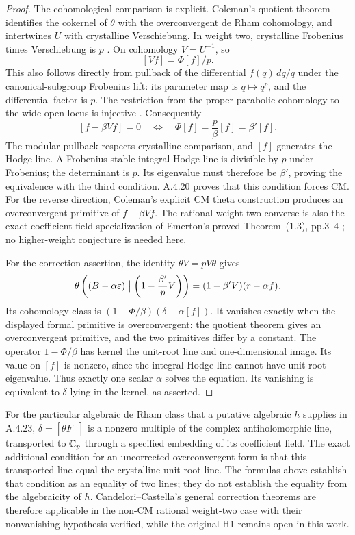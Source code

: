 \begin{proof}
The cohomological comparison is explicit. Coleman's quotient theorem identifies the cokernel of $\theta$ with the overconvergent de Rham cohomology, and intertwines $U$ with crystalline Verschiebung. In weight two, crystalline Frobenius times Verschiebung is $p$ \cite[Theorems 5.1 and 5.4, pp.223 and 225]{EllColeman1996}. On cohomology $V=U^{-1}$, so
\[
 [Vf]=\Phi[f]/p.
\]
This also follows directly from pullback of the differential $f(q)\,dq/q$ under the canonical-subgroup Frobenius lift: its parameter map is $q\mapsto q^p$, and the differential factor is $p$. The restriction from the proper parabolic cohomology to the wide-open locus is injective \cite[equation (6), p.6]{EllCandeloriCastella2017}. Consequently
\[
 [f-\beta Vf]=0
 \quad\Longleftrightarrow\quad
 \Phi[f]=\frac p\beta[f]=\beta'[f].
\]
The modular pullback respects crystalline comparison, and $[f]$ generates the Hodge line. A Frobenius-stable integral Hodge line is divisible by $p$ under Frobenius; the determinant is $p$. Its eigenvalue must therefore be $\beta'$, proving the equivalence with the third condition. A.4.20 proves that this condition forces CM. For the reverse direction, Coleman's explicit CM theta construction \cite[Proposition 7.1, p.231]{EllColeman1996} produces an overconvergent primitive of $f-\beta Vf$. The rational weight-two converse is also the exact coefficient-field specialization of Emerton's proved Theorem~(1.3), pp.3--4 \cite{EllEmertonCM}; no higher-weight conjecture is needed here.

For the correction assertion, the identity $\theta V=pV\theta$ gives
\[
 \theta\left((B-\alpha\varepsilon)\bigm|\left(1-\frac{\beta'}pV\right)\right)
 =(1-\beta' V)(r-\alpha f).
\]
Its cohomology class is
$(1-\Phi/\beta)(\delta-\alpha[f])$. It vanishes exactly when the displayed formal primitive is overconvergent: the quotient theorem gives an overconvergent primitive, and the two primitives differ by a constant. The operator $1-\Phi/\beta$ has kernel the unit-root line and one-dimensional image. Its value on $[f]$ is nonzero, since the integral Hodge line cannot have unit-root eigenvalue. Thus exactly one scalar $\alpha$ solves the equation. Its vanishing is equivalent to $\delta$ lying in the kernel, as asserted.
\end{proof}

For the particular algebraic de Rham class that a putative algebraic $h$ supplies in A.4.23, $\delta=[\theta F^+]$ is a nonzero multiple of the complex antiholomorphic line, transported to $\mathbb C_p$ through a specified embedding of its coefficient field. The exact additional condition for an uncorrected overconvergent form is that this transported line equal the crystalline unit-root line. The formulas above establish that condition as an equality of two lines; they do not establish the equality from the algebraicity of $h$. Candelori--Castella's general correction theorems \cite[Theorems 5.3 and 5.5, pp.11--12]{EllCandeloriCastella2017} are therefore applicable in the non-CM rational weight-two case with their nonvanishing hypothesis verified, while the original H1 remains open in this work.



